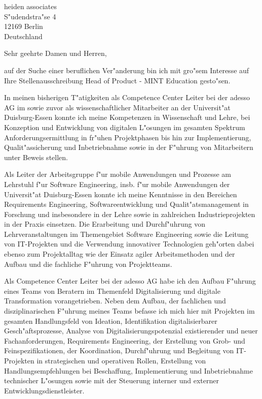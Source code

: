 \documentclass[11pt,a4paper]{dinbrief}
\date{\today}
\begin{document}
 
\begin{letter}  
{%
	heiden associates\\
	S"udendstra"se 4\\
	12169 Berlin\\
	Deutschland
}
\subject{\bf Bewerbung Head of Product - MINT Education}
\opening{Sehr geehrte Damen und Herren,}
auf der Suche einer beruflichen Ver"anderung bin ich mit gro"sem Interesse auf Ihre Stellenausschreibung Head of Product - MINT Education gesto"sen. 

In meinen bisherigen T"atigkeiten als Competence Center Leiter bei der adesso AG im sowie zuvor als wissenschaftlicher Mitarbeiter an der Universit"at Duisburg-Essen konnte ich meine Kompetenzen in Wissenschaft und Lehre, bei Konzeption und Entwicklung von digitalen L"osungen im gesamten Spektrum Anforderungsermittlung in fr"uhen Projektphasen bis hin zur Implementierung, Qualit"assicherung und Inbetriebnahme sowie in der F"uhrung von Mitarbeitern unter Beweis stellen.

Als Leiter der Arbeitsgruppe f"ur mobile Anwendungen und Prozesse am Lehrstuhl f"ur Software Engineering, insb. f"ur mobile Anwendungen der Universit"at Duisburg-Essen konnte ich meine Kenntnisse in den Bereichen Requirements Engineering, Softwareentwicklung  und Qualit"atsmanagement in Forschung und insbesondere in der Lehre sowie in zahlreichen Industrieprojekten in der Praxis einsetzen. Die Erarbeitung und Durchf"uhrung von Lehrveranstaltungen im Themengebiet Software Engineering sowie die Leitung von IT-Projekten und die Verwendung innovativer Technologien geh"orten dabei ebenso zum Projektalltag wie der Einsatz agiler Arbeitsmethoden und der Aufbau und die fachliche  F"uhrung von Projektteams.

Als Competence Center Leiter bei der adesso AG habe ich den Aufbau F"uhrung eines Teams von Beratern im Themenfeld Digitalisierung und digitale Transformation vorangetrieben. Neben dem Aufbau, der fachlichen und disziplinarischen F"uhrung meines Teams befasse ich mich hier mit Projekten im gesamten Handlungsfeld von Ideation, Identifikation digitalisierbarer Gesch"aftsprozesse, Analyse von Digitalisierungspotenzial existierender und neuer Fachanforderungen, Requirements Engineering, der Erstellung von Grob- und Feinspezifikationen, der Koordination, Durchf"uhrung und Begleitung von IT-Projekten in strategischen und operativen Rollen, Erstellung von Handlungsempfehlungen bei Beschaffung, Implementierung und Inbetriebnahme technischer L"osungen sowie mit der Steuerung interner und externer Entwicklungsdienstleister. 


\end{letter}
\end{document}
